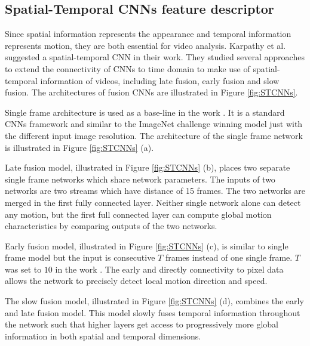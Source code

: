 \subsection{Spatial-Temporal CNNs feature descriptor}
\label{2_3_1}

Since spatial information represents the appearance and temporal information represents motion, they are both essential for video analysis. Karpathy et al. suggested a spatial-temporal CNN in their work\cite{karpathy2014}. They studied several approaches to extend the connectivity of CNNs to time domain to make use of spatial-temporal information of videos, including late fusion, early fusion and slow fusion. The architectures of fusion CNNs are illustrated in Figure \ref{fig:STCNNs}. 
\par 
Single frame architecture is used as a base-line in the work \cite{karpathy2014}. It is a standard CNNs framework and similar to the ImageNet challenge winning model \cite{kriz2012} just with the different input image resolution. The architecture of the single frame network is illustrated in Figure \ref{fig:STCNNs} (a).
\par 
Late fusion model, illustrated in Figure \ref{fig:STCNNs} (b), places two separate single frame networks which share network parameters. The inputs of two networks are two streams which have distance of 15 frames. The two networks are merged in the first fully connected layer. Neither single network alone can detect any motion, but the first full connected layer can compute global motion characteristics by comparing outputs of the two networks. 
\par 
Early fusion model, illustrated in Figure \ref{fig:STCNNs} (c), is similar to single frame model but the input is consecutive \(T\) frames instead of one single frame. \(T\) was set to \(10\) in the work \cite{karpathy2014}. The early and directly connectivity to pixel data allows the network to precisely detect local motion direction and speed.
\par 
The slow fusion model, illustrated in Figure \ref{fig:STCNNs} (d),  combines the early and late fusion model. This model slowly fuses temporal information throughout the network such that higher layers get access to progressively more global information in both spatial and temporal dimensions. 

